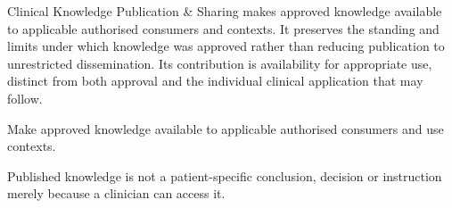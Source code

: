 Clinical Knowledge Publication \& Sharing makes approved knowledge available to applicable authorised consumers and contexts. It preserves the standing and limits under which knowledge was approved rather than reducing publication to unrestricted dissemination. Its contribution is availability for appropriate use, distinct from both approval and the individual clinical application that may follow.



Make approved knowledge available to applicable authorised consumers and use contexts.



Published knowledge is not a patient-specific conclusion, decision or instruction merely because a clinician can access it.


